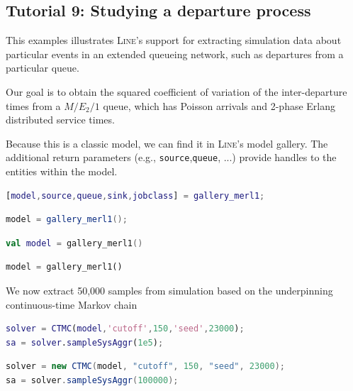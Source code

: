 \subsection{Tutorial 9: Studying a departure process}
\label{example-9-studying-a-departure-process}
This examples illustrates \textsc{Line}'s support for extracting simulation data about particular events in an extended queueing network, such as departures from a particular queue.

Our goal is to obtain the squared coefficient of variation of the inter-departure times from a $M/E_2/1$ queue, which has Poisson arrivals and 2-phase Erlang distributed service times.

Because this is a classic model, we can find it in \textsc{Line}'s model gallery. The additional return parameters (e.g., \texttt{source},\texttt{queue}, ...) provide handles to the entities within the model.
\begin{MATLAB}
\begin{lstlisting}[language = matlab]
[model,source,queue,sink,jobclass] = gallery_merl1;
\end{lstlisting}
\end{MATLAB}
\begin{JAVA}
\begin{lstlisting}[language=java, basicstyle=\ttfamily\scriptsize]
model = gallery_merl1();
\end{lstlisting}
\end{JAVA}
\begin{KOTLIN}
\begin{lstlisting}[language = kotlin, basicstyle=\ttfamily\scriptsize]
val model = gallery_merl1()
\end{lstlisting}
\end{KOTLIN}
\begin{PYTHON}
\begin{lstlisting}[language = python]
model = gallery_merl1()
\end{lstlisting}
\end{PYTHON}
We now extract 50,000 samples from simulation based on the underpinning continuous-time Markov chain
\begin{MATLAB}
\begin{lstlisting}[language = matlab]
solver = CTMC(model,'cutoff',150,'seed',23000);
sa = solver.sampleSysAggr(1e5);
\end{lstlisting}
\end{MATLAB}
\begin{JAVA}
\begin{lstlisting}[language=java, basicstyle=\ttfamily\scriptsize]
solver = new CTMC(model, "cutoff", 150, "seed", 23000);
sa = solver.sampleSysAggr(100000);
\end{lstlisting}
\end{JAVA}
